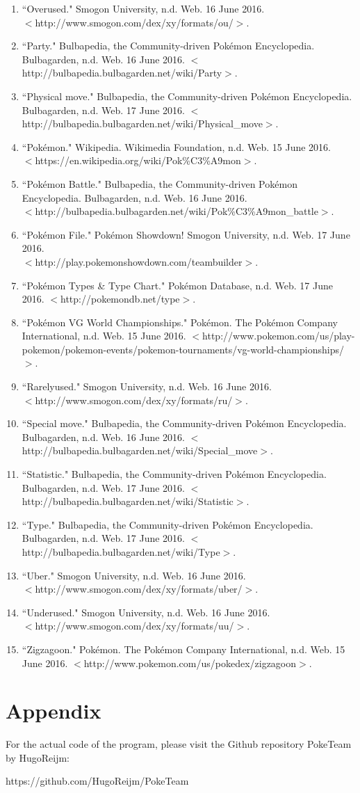 \documentclass{article}
\begin{document}
\begin{enumerate}
	\item ``Overused." Smogon University, n.d. Web. 16 June 2016. \\$<$http://www.smogon.com/dex/xy/formats/ou/$>$.
	\item ``Party." Bulbapedia, the Community-driven Pokémon Encyclopedia. Bulbagarden, n.d. Web. 16 June 2016. $<$http://bulbapedia.bulbagarden.net/wiki/Party$>$.  
	\item ``Physical move." Bulbapedia, the Community-driven Pokémon Encyclopedia. Bulbagarden, n.d. Web. 17 June 2016. $<$http://bulbapedia.bulbagarden.net/wiki/Physical\_move$>$.
	\item ``Pokémon." Wikipedia. Wikimedia Foundation, n.d. Web. 15 June 2016. \\$<$https://en.wikipedia.org/wiki/Pok\%C3\%A9mon$>$. 
	\item ``Pokémon Battle." Bulbapedia, the Community-driven Pokémon Encyclopedia. Bulbagarden, n.d. Web. 16 June 2016. \\$<$http://bulbapedia.bulbagarden.net/wiki/Pok\%C3\%A9mon\_battle$>$.  
	\item ``Pok\'emon File." Pok\'emon Showdown! Smogon University, n.d. Web. 17 June 2016. \\$<$http://play.pokemonshowdown.com/teambuilder$>$.
	\item ``Pokémon Types \& Type Chart." Pokémon Database, n.d. Web. 17 June 2016. $<$http://pokemondb.net/type$>$. 
	\item ``Pokémon VG World Championships." Pok\'emon. The Pok\'emon Company International, n.d. Web. 15 June 2016. $<$http://www.pokemon.com/us/play-pokemon/pokemon-events/pokemon-tournaments/vg-world-championships/$>$.
	\item ``Rarelyused." Smogon University, n.d. Web. 16 June 2016. \\$<$http://www.smogon.com/dex/xy/formats/ru/$>$.
	\item ``Special move." Bulbapedia, the Community-driven Pokémon Encyclopedia. Bulbagarden, n.d. Web. 16 June 2016. $<$http://bulbapedia.bulbagarden.net/wiki/Special\_move$>$.
	\item  ``Statistic." Bulbapedia, the Community-driven Pokémon Encyclopedia. Bulbagarden, n.d. Web. 17 June 2016. $<$http://bulbapedia.bulbagarden.net/wiki/Statistic$>$.
	\item ``Type." Bulbapedia, the Community-driven Pokémon Encyclopedia. Bulbagarden, n.d. Web. 17 June 2016. $<$http://bulbapedia.bulbagarden.net/wiki/Type$>$.
	\item ``Uber." Smogon University, n.d. Web. 16 June 2016. \\$<$http://www.smogon.com/dex/xy/formats/uber/$>$.
	\item ``Underused." Smogon University, n.d. Web. 16 June 2016. \\$<$http://www.smogon.com/dex/xy/formats/uu/$>$.
	\item ``Zigzagoon." Pok\'emon. The Pok\'emon Company International, n.d. Web. 15 June 2016. $<$http://www.pokemon.com/us/pokedex/zigzagoon$>$.
\end{enumerate}
\section{Appendix}
For the actual code of the program, please visit the Github repository PokeTeam by HugoReijm:\\
\begin{center}
	https://github.com/HugoReijm/PokeTeam
\end{center}
\end{document}
